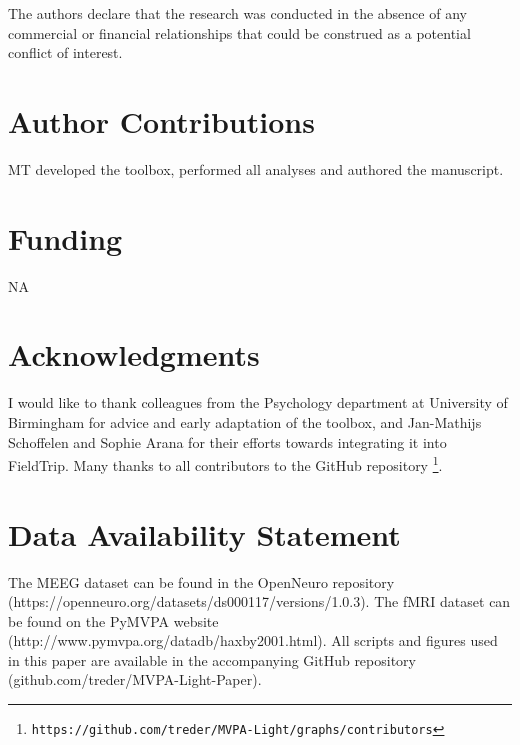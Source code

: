 \documentclass[utf8]{frontiersSCNS} %
\newcommand{\ttt}[1]{\texttt{#1}}
\begin{document}
The authors declare that the research was conducted in the absence of any commercial or financial relationships that could be construed as a potential conflict of interest.

\section*{Author Contributions}

MT developed the toolbox, performed all analyses and authored the manuscript.

\section*{Funding}
NA

\section*{Acknowledgments}
I would like to thank colleagues from the Psychology department at University of Birmingham for advice and early adaptation of the toolbox, and Jan-Mathijs Schoffelen and Sophie Arana for their efforts towards integrating it into FieldTrip. Many thanks to all contributors to the GitHub repository
\footnote{\ttt{https://github.com/treder/MVPA-Light/graphs/contributors}}.


\section*{Data Availability Statement}
The MEEG dataset can be found in the OpenNeuro repository (https://openneuro.org/datasets/ds000117/versions/1.0.3). The fMRI dataset can be found on the PyMVPA website (http://www.pymvpa.org/datadb/haxby2001.html). All scripts and figures used in this paper are available in the accompanying GitHub repository (github.com/treder/MVPA-Light-Paper).



\end{document}
